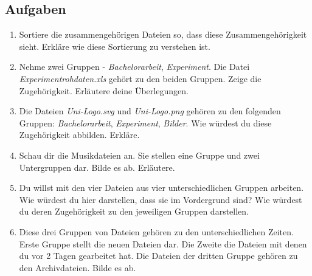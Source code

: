 \subsection{Aufgaben}
\label{aufgaben}

\begin{enumerate}
\item Sortiere die zusammengehörigen Dateien so, dass diese Zusammengehörigkeit sieht. Erkläre wie diese Sortierung zu verstehen ist.

\item Nehme zwei Gruppen - \emph{Bachelorarbeit}, \emph{Experiment}. Die Datei \emph{Experimentrohdaten.xls} gehört zu den beiden Gruppen. Zeige die Zugehörigkeit. Erläutere deine Überlegungen.

\item Die Dateien \emph{Uni-Logo.svg} und \emph{Uni-Logo.png} gehören zu den folgenden Gruppen: \emph{Bachelorarbeit}, \emph{Experiment}, \emph{Bilder}. Wie würdest du diese Zugehörigkeit abbilden. Erkläre.

\item Schau dir die Musikdateien an. Sie stellen eine Gruppe und zwei Untergruppen dar. Bilde es ab. Erläutere.

\item Du willst mit den vier Dateien aus vier unterschiedlichen Gruppen arbeiten. Wie würdest du hier darstellen, dass sie im Vordergrund sind? Wie würdest du deren Zugehörigkeit zu den jeweiligen Gruppen darstellen.

\item Diese drei Gruppen von Dateien gehören zu den unterschiedlichen Zeiten. Erste Gruppe stellt die neuen Dateien dar. Die Zweite die Dateien mit denen du vor 2 Tagen gearbeitet hat. Die Dateien der dritten Gruppe gehören zu den Archivdateien. Bilde es ab.

\end{enumerate}




